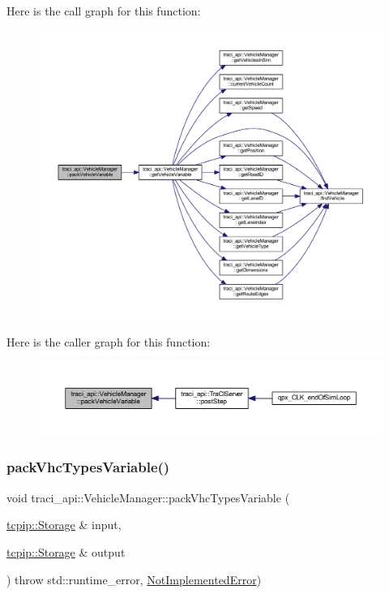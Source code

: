 Here is the call graph for this function\+:
\nopagebreak
\begin{figure}[H]
\begin{center}
\leavevmode
\includegraphics[width=350pt]{classtraci__api_1_1_vehicle_manager_a4b246d7f01b5f37679830f677328fc16_cgraph}
\end{center}
\end{figure}
Here is the caller graph for this function\+:
\nopagebreak
\begin{figure}[H]
\begin{center}
\leavevmode
\includegraphics[width=350pt]{classtraci__api_1_1_vehicle_manager_a4b246d7f01b5f37679830f677328fc16_icgraph}
\end{center}
\end{figure}
\mbox{\label{classtraci__api_1_1_vehicle_manager_abf96c7635d046d03bc02aa0cbc384d17}} 
\subsubsection{\texorpdfstring{pack\+Vhc\+Types\+Variable()}{packVhcTypesVariable()}}
{\footnotesize\ttfamily void traci\+\_\+api\+::\+Vehicle\+Manager\+::pack\+Vhc\+Types\+Variable (\begin{DoxyParamCaption}\item[{\hyperlink{classtcpip_1_1_storage}{tcpip\+::\+Storage} \&}]{input,  }\item[{\hyperlink{classtcpip_1_1_storage}{tcpip\+::\+Storage} \&}]{output }\end{DoxyParamCaption}) throw  std\+::runtime\+\_\+error, \hyperlink{classtraci__api_1_1_not_implemented_error}{Not\+Implemented\+Error}) }

